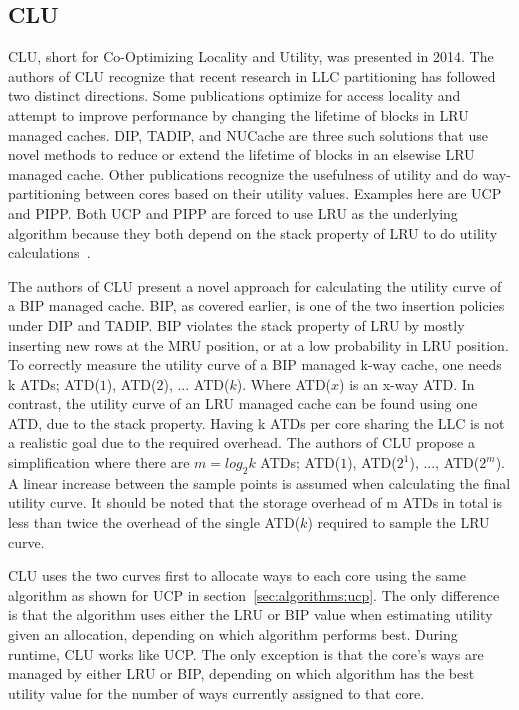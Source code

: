
\subsection{CLU}
\label{sec:algorithms:clu}

CLU, short for Co-Optimizing Locality and Utility, was presented in 2014.
The authors of CLU recognize that recent research in LLC partitioning has followed two distinct directions.
Some publications optimize for access locality and attempt to improve performance by changing the lifetime of blocks in LRU managed caches.
DIP, TADIP, and NUCache are three such solutions that use novel methods to reduce or extend the lifetime of blocks in an elsewise LRU managed cache.
Other publications recognize the usefulness of utility and do way-partitioning between cores based on their utility values.
Examples here are UCP and PIPP.
Both UCP and PIPP are forced to use LRU as the underlying algorithm because they both depend on the stack property of LRU to do utility calculations~\cite{Qureshi2006, Xie2009}.

The authors of CLU present a novel approach for calculating the utility curve of a BIP managed cache.
BIP, as covered earlier, is one of the two insertion policies under DIP and TADIP. 
BIP violates the stack property of LRU by mostly inserting new rows at the MRU position, or at a low probability in LRU position.
To correctly measure the utility curve of a BIP managed k-way cache, one needs k ATDs; ATD($1$), ATD($2$), ... ATD($k$). 
Where ATD($x$) is an x-way ATD.
In contrast, the utility curve of an LRU managed cache can be found using one ATD, due to the stack property.
Having k ATDs per core sharing the LLC is not a realistic goal due to the required overhead.
The authors of CLU propose a simplification where there are $m = log_2 k$ ATDs; ATD($1$), ATD($2^1$), ..., ATD($2^m$).
A linear increase between the sample points is assumed when calculating the final utility curve.
It should be noted that the storage overhead of m ATDs in total is less than twice the overhead of the single ATD($k$) required to sample the LRU curve.

CLU uses the two curves first to allocate ways to each core using the same algorithm as shown for UCP in section~\ref{sec:algorithms:ucp}.
The only difference is that the algorithm uses either the LRU or BIP value when estimating utility given an allocation, depending on which algorithm performs best.
During runtime, CLU works like UCP.
The only exception is that the core's ways are managed by either LRU or BIP, depending on which algorithm has the best utility value for the number of ways currently assigned to that core.

